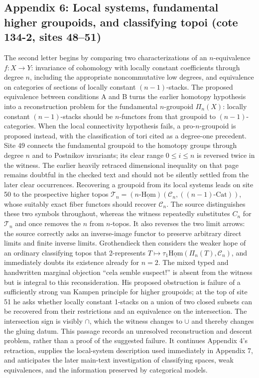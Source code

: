 \documentclass[10pt,oneside]{book}
\begin{document}
\subsection*{Appendix 6: Local systems, fundamental higher groupoids, and classifying topoi (cote 134-2, sites 48--51)}
The second letter begins by comparing two characterizations of an $n$-equivalence $f:X\to Y$: invariance of cohomology with locally constant coefficients through degree $n$, including the appropriate noncommutative low degrees, and equivalence on categories of sections of locally constant $(n-1)$-stacks. The proposed equivalence between conditions A and B turns the earlier homotopy hypothesis into a reconstruction problem for the fundamental $n$-groupoid $\Pi_n(X)$: locally constant $(n-1)$-stacks should be $n$-functors from that groupoid to $(n-1)$-categories. When the local connectivity hypothesis fails, a pro-$n$-groupoid is proposed instead, with the classification of tori cited as a degree-one precedent. Site 49 connects the fundamental groupoid to the homotopy groups through degree $n$ and to Postnikov invariants; its clear range $0\leq i\leq n$ is reversed twice in the witness. The earlier heavily retraced dimensional inequality on that page remains doubtful in the checked text and should not be silently settled from the later clear occurrences. Recovering a groupoid from its local systems leads on site 50 to the prospective higher topos $\mathcal T_n=(n\text{-}\underline{\mathrm{Hom}})(\mathcal C_n,((n-1)\text{-Cat}))$, whose suitably exact fiber functors should recover $\mathcal C_n$. The source distinguishes these two symbols throughout, whereas the witness repeatedly substitutes $C_n$ for $\mathcal T_n$ and once removes the $n$ from $n$-topos. It also reverses the two limit arrows: the source correctly asks an inverse-image functor to preserve arbitrary direct limits and finite inverse limits. Grothendieck then considers the weaker hope of an ordinary classifying topos that 2-represents $T\mapsto\tau_1\underline{\mathrm{Hom}}(\Pi_n(T),\mathcal C_n)$, and immediately doubts its existence already for $n=2$. The mixed typed and handwritten marginal objection ``cela semble suspect!'' is absent from the witness but is integral to this reconsideration. His proposed obstruction is failure of a sufficiently strong van Kampen principle for higher groupoids; at the top of site 51 he asks whether locally constant 1-stacks on a union of two closed subsets can be recovered from their restrictions and an equivalence on the intersection. The intersection sign is visibly $\cap$, which the witness changes to $\cup$ and thereby changes the gluing datum. This passage records an unresolved reconstruction and descent problem, rather than a proof of the suggested failure. It continues Appendix 4's retraction, supplies the local-system description used immediately in Appendix 7, and anticipates the later main-text investigation of classifying spaces, weak equivalences, and the information preserved by categorical models.
\end{document}
